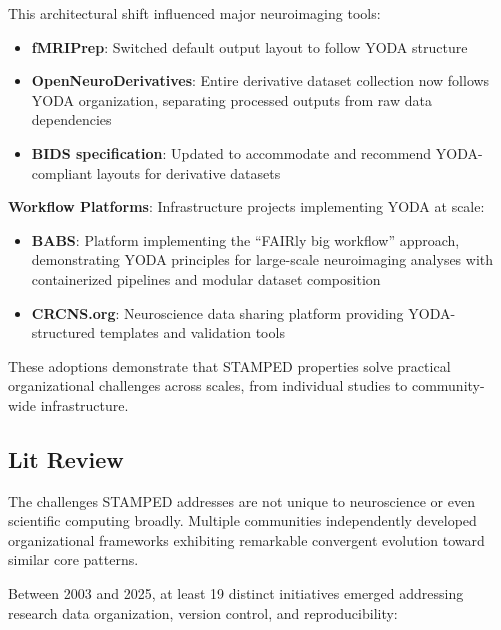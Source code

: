 \documentclass{article}
\begin{document}
This architectural shift influenced major neuroimaging tools:
\begin{itemize}
    \item \textbf{fMRIPrep}: Switched default output layout to follow YODA structure
    \item \textbf{OpenNeuroDerivatives}: Entire derivative dataset collection now follows YODA organization, separating processed outputs from raw data dependencies
    \item \textbf{BIDS specification}: Updated to accommodate and recommend YODA-compliant layouts for derivative datasets
\end{itemize}

\textbf{Workflow Platforms}: Infrastructure projects implementing YODA at scale:
\begin{itemize}
    \item \textbf{BABS}\cite{zhao_reproducible_2024}: Platform implementing the ``FAIRly big workflow'' approach, demonstrating YODA principles for large-scale neuroimaging analyses with containerized pipelines and modular dataset composition
    \item \textbf{CRCNS.org}: Neuroscience data sharing platform providing YODA-structured templates and validation tools
\end{itemize}

These adoptions demonstrate that STAMPED properties solve practical organizational challenges across scales, from individual studies to community-wide infrastructure.

\subsection{Lit Review}


The challenges STAMPED addresses are not unique to neuroscience or even scientific computing broadly.
Multiple communities independently developed organizational frameworks exhibiting remarkable convergent evolution toward similar core patterns.

Between 2003 and 2025, at least 19 distinct initiatives emerged addressing research data organization, version control, and reproducibility:
\end{document}
